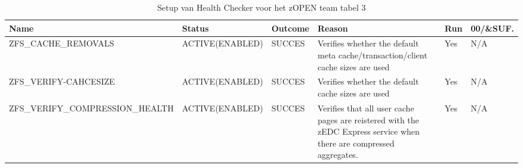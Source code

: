 \begin{landscape}
	\begin{table}[h]
		\begin{tabular}{|l|p{2.3cm}|l|p{4.5cm}|l|l|}
			\hline
			\textbf{Name}                       & \textbf{Status}   & \textbf{Outcome} & \textbf{Reason}    & \textbf{Run} &	\textbf{00/\&SUF.} \\ \hline
			ZFS\_CACHE\_REMOVALS             & ACTIVE(ENABLED) & SUCCES & Verifies   whether the default meta cache/transaction/client    cache   sizes are used                                      & Yes & N/A \\ \hline
			ZFS\_VERIFY-CAHCESIZE            & ACTIVE(ENABLED) & SUCCES & Verifies   whether the default cache sizes are used                                                                         & Yes & N/A \\ \hline
			ZFS\_VERIFY\_COMPRESSION\_HEALTH & ACTIVE(ENABLED) & SUCCES & Verifies   that all user cache pages are reistered with the zEDC    Express   service when there are compressed aggregates. & Yes & N/A \\ \hline
		\end{tabular}
		\caption[Health Checker zOpen team tabel 3]{Setup van Health Checker voor het zOPEN team tabel 3}
		\label{tbl:zOpen Team Tabel 3}
	\end{table}
\end{landscape}

